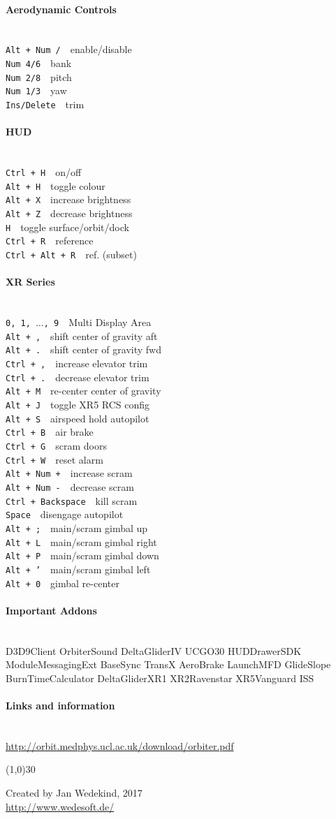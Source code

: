 \documentclass[11pt]{scrartcl} %
\newcommand{\command}[2]{\texttt{#1}~\dotfill{}~#2\\} %
\newcommand{\sectiontitle}[1]{\paragraph{#1} \ \\} %
\newcommand{\sep}{\hspace{5mm}}
\begin{document}
\sep
\begin{minipage}[t]{64mm}
\sectiontitle{Aerodynamic Controls}
\command{Alt + Num /}{enable/disable}
\command{Num 4/6}{bank}
\command{Num 2/8}{pitch}
\command{Num 1/3}{yaw}
\command{Ins/Delete}{trim}

\sectiontitle{HUD}
\command{Ctrl + H}{on/off}
\command{Alt + H}{toggle colour}
\command{Alt + X}{increase brightness}
\command{Alt + Z}{decrease brightness}
\command{H}{toggle surface/orbit/dock}
\command{Ctrl + R}{reference}
\command{Ctrl + Alt + R}{ref. (subset)}

\sectiontitle{XR Series}
\command{0, 1, $\ldots$, 9}{Multi Display Area}
\command{Alt + ,}{shift center of gravity aft}
\command{Alt + .}{shift center of gravity fwd}
\command{Ctrl + ,}{increase elevator trim}
\command{Ctrl + .}{decrease elevator trim}
\command{Alt + M}{re-center center of gravity}
\command{Alt + J}{toggle XR5 RCS config}
\command{Alt + S}{airspeed hold autopilot}
\command{Ctrl + B}{air brake}
\command{Ctrl + G}{scram doors}
\command{Ctrl + W}{reset alarm}
\command{Alt + Num +}{increase scram}
\command{Alt + Num -}{decrease scram}
\command{Ctrl + Backspace}{kill scram}
\command{Space}{disengage autopilot}
\command{Alt + ;}{main/scram gimbal up}
\command{Alt + L}{main/scram gimbal right}
\command{Alt + P}{main/scram gimbal down}
\command{Alt + '}{main/scram gimbal left}
\command{Alt + 0}{gimbal re-center}
\end{minipage}
\sep
\begin{minipage}[t]{64mm}
\sectiontitle{Important Addons}
D3D9Client
OrbiterSound
DeltaGliderIV
UCGO30
HUDDrawerSDK
ModuleMessagingExt
BaseSync
TransX
AeroBrake
LaunchMFD
GlideSlope
BurnTimeCalculator
DeltaGliderXR1
XR2Ravenstar
XR5Vanguard
ISS\\

\vspace{\baselineskip}
\sectiontitle{Links and information}

\url{http://orbit.medphys.ucl.ac.uk/download/orbiter.pdf}

\linethickness{0.5mm} %
{\color{mygray}\line(1,0){30}} %

\footnotesize{
Created by Jan Wedekind, 2017\\
\url{http://www.wedesoft.de/}\\
}

\end{minipage} %
\end{document}
